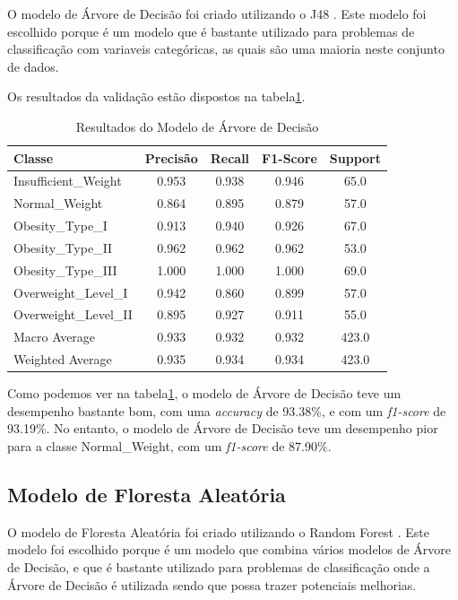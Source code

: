 \documentclass{easychair}
\begin{document}
O modelo de Árvore de Decisão foi criado utilizando o J48 \cite{j48}. Este modelo foi escolhido porque é um modelo que é bastante utilizado para problemas de classificação com variaveis categóricas, as quais são uma maioria neste conjunto de dados.

Os resultados da validação estão dispostos na tabela\ref{tab:decision-tree-results}.

\begin{table}[ht]
  \centering
  \begin{tabular}{l c c c c}
  \toprule
  Classe                 & Precisão & Recall & F1-Score & Support \\
  \midrule
  Insufficient\_Weight  & 0.953     & 0.938  & 0.946    & 65.0    \\
  Normal\_Weight        & 0.864     & 0.895  & 0.879    & 57.0    \\
  Obesity\_Type\_I      & 0.913     & 0.940  & 0.926    & 67.0    \\
  Obesity\_Type\_II     & 0.962     & 0.962  & 0.962    & 53.0    \\
  Obesity\_Type\_III    & 1.000     & 1.000  & 1.000    & 69.0    \\
  Overweight\_Level\_I  & 0.942     & 0.860  & 0.899    & 57.0    \\
  Overweight\_Level\_II & 0.895     & 0.927  & 0.911    & 55.0    \\
  \midrule
  Macro Average         & 0.933     & 0.932  & 0.932    & 423.0   \\
  Weighted Average      & 0.935     & 0.934  & 0.934    & 423.0   \\
  \bottomrule
  \end{tabular}
  \caption{Resultados do Modelo de Árvore de Decisão}
  \label{tab:decision-tree-results}
\end{table}

Como podemos ver na tabela\ref{tab:decision-tree-results}, o modelo de Árvore de Decisão teve um desempenho bastante bom, com uma \textit{accuracy} de 93.38\%, e com um \textit{f1-score} de 93.19\%. No entanto, o modelo de Árvore de Decisão teve um desempenho pior para a classe Normal\_Weight, com um \textit{f1-score} de 87.90\%.

\subsection{Modelo de Floresta Aleatória}

O modelo de Floresta Aleatória foi criado utilizando o Random Forest \cite{random-forest}. Este modelo foi escolhido porque é um modelo que combina vários modelos de Árvore de Decisão, e que é bastante utilizado para problemas de classificação onde a Árvore de Decisão é utilizada sendo que possa trazer potenciais melhorias.
\end{document}
